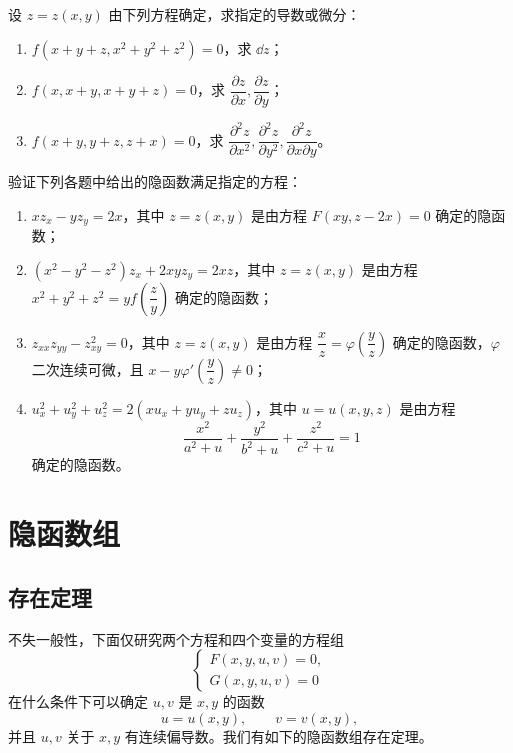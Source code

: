 \begin{xexercise}[4]
设 $z=z(x,y)$ 由下列方程确定，求指定的导数或微分：
  \begin{enumerate}[label=(\arabic*)]
    \item $f(x+y+z,x^2+y^2+z^2)=0$，求 $\dd z$；
    \item $f(x,x+y,x+y+z)=0$，求 $\dfrac{\partial z}{\partial x},\dfrac{\partial z}{\partial y}$；
    \item $f(x+y,y+z,z+x)=0$，求 $\dfrac{\partial^2z}{\partial x^2},\dfrac{\partial^2z}{\partial y^2},\dfrac{\partial^2z}{\partial x\partial y}$。
  \end{enumerate}
\end{xexercise}

\begin{xexercise}[5]
验证下列各题中给出的隐函数满足指定的方程：
  \begin{enumerate}[label=(\arabic*)]
    \item $xz_x-yz_y=2x$，其中 $z=z(x,y)$ 是由方程 $F(xy,z-2x)=0$ 确定的隐函数；
    \item $(x^2-y^2-z^2)z_x+2xyz_y=2xz$，其中 $z=z(x,y)$ 是由方程 $x^2+y^2+z^2=yf\!\left(\dfrac{z}{y}\right)$ 确定的隐函数；
    \item $z_{xx}z_{yy}-z_{xy}^2=0$，其中 $z=z(x,y)$ 是由方程 $\dfrac{x}{z}=\varphi\!\left(\dfrac{y}{z}\right)$ 确定的隐函数，$\varphi$ 二次连续可微，且 $x-y\varphi'\!\left(\dfrac{y}{z}\right)\ne0$；
    \item $u_x^2+u_y^2+u_z^2=2(xu_x+yu_y+zu_z)$，其中 $u=u(x,y,z)$ 是由方程
    \[
      \frac{x^2}{a^2+u}+\frac{y^2}{b^2+u}+\frac{z^2}{c^2+u}=1
    \]
    确定的隐函数。
  \end{enumerate}
\end{xexercise}

\section{隐函数组}

\subsection{存在定理}

不失一般性，下面仅研究两个方程和四个变量的方程组
\[
  \begin{cases}
    F(x,y,u,v)=0,\\
    G(x,y,u,v)=0
  \end{cases}
\]
在什么条件下可以确定 $u,v$ 是 $x,y$ 的函数
\[
  u=u(x,y),\qquad v=v(x,y),
\]
并且 $u,v$ 关于 $x,y$ 有连续偏导数。我们有如下的隐函数组存在定理。

